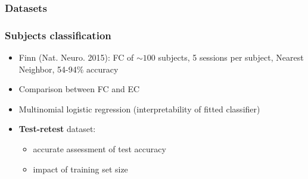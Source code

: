 \documentclass[final]{beamer}
\begin{document}
\begin{frame}
\transdissolve
\frametitle{Datasets}
	\centering
{}
\end{frame}

\begin{frame}
\transdissolve
\frametitle{Subjects classification}
\begin{itemize}
		\pause
	\item Finn (Nat. Neuro. 2015): FC of $\sim100$ subjects, 5 sessions per subject, Nearest Neighbor, 54-94\% accuracy   
		\pause
	\item Comparison between FC and EC
		\pause
	\item Multinomial logistic regression (interpretability of fitted classifier)
		\pause
	\item \textbf{Test-retest} dataset: 
		\pause
		\begin{itemize}
			\item accurate assessment of test accuracy 
		\pause
			\item impact of training set size
		\end{itemize}
\end{itemize}
\end{frame}
\end{document}
